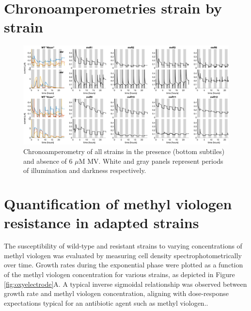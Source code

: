 \documentclass[12pt]{article}
\begin{document}
\section{Chronoamperometries strain by strain}

\begin{figure}[H]
    \centering
    \includegraphics[width=\hsize]{../Figures/MV_adaptation/MVR_chronoamp_panels_all}
    \caption{Chronoamperometry of all strains in the presence (bottom subtiles) and absence of 6 $\mu$M MV. White and gray panels represent periods of illumination and darkness respectively. }
    \label{fig:spotassayMV}
\end{figure}


\section{Quantification of methyl viologen resistance in adapted strains}

The susceptibility of wild-type and resistant strains to varying concentrations of methyl viologen was evaluated by measuring cell density spectrophotometrically over time. Growth rates during the exponential phase were plotted as a function of the methyl viologen concentration for various strains, as depicted in Figure \ref{fig:oxyelectrode}A. A typical inverse sigmoidal relationship was observed between growth rate and methyl viologen concentration, aligning with dose-response expectations typical for an antibiotic agent such as methyl viologen..
\end{document}
